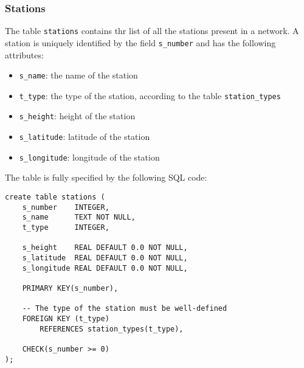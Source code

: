 \subsubsection{Stations}
The table \texttt{stations} contains thr list of all the stations present in a
network. A station is uniquely identified by the field \texttt{s\_number} and has
the following attributes:
\begin{itemize}
    \item \texttt{s\_name}: the name of the station
    \item \texttt{t\_type}: the type of the station, according to the table \texttt{station\_types} 
    \item \texttt{s\_height}: height of the station
    \item \texttt{s\_latitude}: latitude of the station
    \item \texttt{s\_longitude}: longitude of the station
\end{itemize}

The table is fully specified by the following SQL code:
\begin{verbatim}
create table stations (
    s_number    INTEGER,
    s_name      TEXT NOT NULL,
    t_type      INTEGER,

    s_height    REAL DEFAULT 0.0 NOT NULL,
    s_latitude  REAL DEFAULT 0.0 NOT NULL,
    s_longitude REAL DEFAULT 0.0 NOT NULL,

    PRIMARY KEY(s_number),
    
    -- The type of the station must be well-defined
    FOREIGN KEY (t_type)
        REFERENCES station_types(t_type),
    
    CHECK(s_number >= 0)
);
\end{verbatim}

